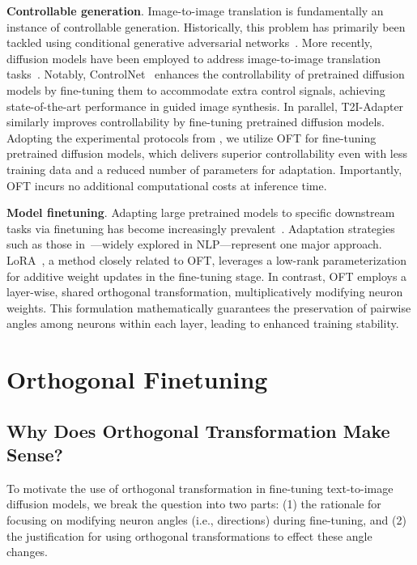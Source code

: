 \textbf{Controllable generation}. Image-to-image translation is fundamentally an instance of controllable generation. Historically, this problem has primarily been tackled using conditional generative adversarial networks~\cite{isola2017image,zhu2017toward,wang2018high,park2019semantic,choi2018stargan}. More recently, diffusion models have been employed to address image-to-image translation tasks~\cite{saharia2022palette,voynov2022sketch,wang2022pretraining}. Notably, ControlNet~\cite{zhang2023adding} enhances the controllability of pretrained diffusion models by fine-tuning them to accommodate extra control signals, achieving state-of-the-art performance in guided image synthesis. In parallel, T2I-Adapter~\cite{mou2023t2i} similarly improves controllability by fine-tuning pretrained diffusion models. Adopting the experimental protocols from \cite{zhang2023adding,mou2023t2i}, we utilize OFT for fine-tuning pretrained diffusion models, which delivers superior controllability even with less training data and a reduced number of parameters for adaptation. Importantly, OFT incurs no additional computational costs at inference time.

\textbf{Model finetuning}. Adapting large pretrained models to specific downstream tasks via finetuning has become increasingly prevalent~\cite{devlin2018bert,brown2020language,he2022masked}. Adaptation strategies such as those in~\cite{hulora2022,houlsby2019parameter,pfeiffer2020adapterfusion}—widely explored in NLP—represent one major approach. LoRA~\cite{hulora2022}, a method closely related to OFT, leverages a low-rank parameterization for additive weight updates in the fine-tuning stage. In contrast, OFT employs a layer-wise, shared orthogonal transformation, multiplicatively modifying neuron weights. This formulation mathematically guarantees the preservation of pairwise angles among neurons within each layer, leading to enhanced training stability.

\section{Orthogonal Finetuning}

\subsection{Why Does Orthogonal Transformation Make Sense?}

To motivate the use of orthogonal transformation in fine-tuning text-to-image diffusion models, we break the question into two parts: (1) the rationale for focusing on modifying neuron angles (i.e., directions) during fine-tuning, and (2) the justification for using orthogonal transformations to effect these angle changes.

